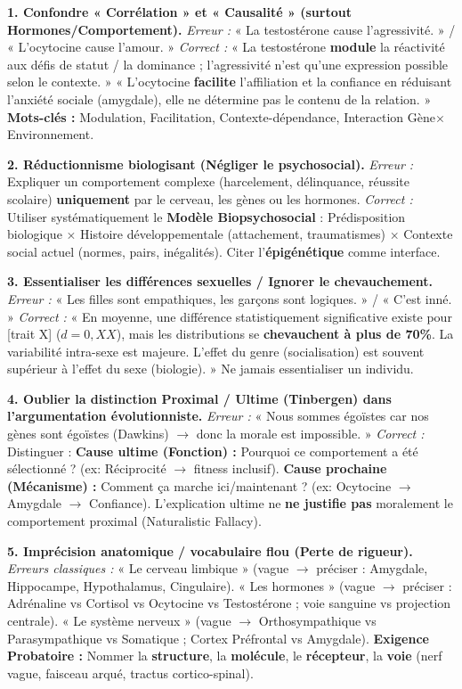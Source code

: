 \documentclass[11pt]{article}
\begin{document}
\begin{attention}
    \textbf{1. Confondre « Corrélation » et « Causalité » (surtout Hormones/Comportement).}
    \textit{Erreur :} « La testostérone cause l'agressivité. » / « L'ocytocine cause l'amour. »
    \textit{Correct :} « La testostérone \textbf{module} la réactivité aux défis de statut / la dominance ; l'agressivité n'est qu'une expression possible selon le contexte. » « L'ocytocine \textbf{facilite} l'affiliation et la confiance en réduisant l'anxiété sociale (amygdale), elle ne détermine pas le contenu de la relation. » \textbf{Mots-clés :} Modulation, Facilitation, Contexte-dépendance, Interaction Gène$\times$Environnement.

    \textbf{2. Réductionnisme biologisant (Négliger le psychosocial).}
    \textit{Erreur :} Expliquer un comportement complexe (harcelement, délinquance, réussite scolaire) \textbf{uniquement} par le cerveau, les gènes ou les hormones.
    \textit{Correct :} Utiliser systématiquement le \textbf{Modèle Biopsychosocial} : Prédisposition biologique $\times$ Histoire développementale (attachement, traumatismes) $\times$ Contexte social actuel (normes, pairs, inégalités). Citer l'\textbf{épigénétique} comme interface.

    \textbf{3. Essentialiser les différences sexuelles / Ignorer le chevauchement.}
    \textit{Erreur :} « Les filles sont empathiques, les garçons sont logiques. » / « C'est inné. »
    \textit{Correct :} « En moyenne, une différence statistiquement significative existe pour [trait X] ($d = 0,XX$), mais les distributions se \textbf{chevauchent à plus de 70\%}. La variabilité intra-sexe est majeure. L'effet du genre (socialisation) est souvent supérieur à l'effet du sexe (biologie). » Ne jamais essentialiser un individu.

    \textbf{4. Oublier la distinction Proximal / Ultime (Tinbergen) dans l'argumentation évolutionniste.}
    \textit{Erreur :} « Nous sommes égoïstes car nos gènes sont égoïstes (Dawkins) $\to$ donc la morale est impossible. »
    \textit{Correct :} Distinguer : \textbf{Cause ultime (Fonction) :} Pourquoi ce comportement a été sélectionné ? (ex: Réciprocité $\to$ fitness inclusif). \textbf{Cause prochaine (Mécanisme) :} Comment ça marche ici/maintenant ? (ex: Ocytocine $\to$ Amygdale $\to$ Confiance). L'explication ultime ne \textbf{ne justifie pas} moralement le comportement proximal (Naturalistic Fallacy).

    \textbf{5. Imprécision anatomique / vocabulaire flou (Perte de rigueur).}
    \textit{Erreurs classiques :} « Le cerveau limbique » (vague $\to$ préciser : Amygdale, Hippocampe, Hypothalamus, Cingulaire). « Les hormones » (vague $\to$ préciser : Adrénaline vs Cortisol vs Ocytocine vs Testostérone ; voie sanguine vs projection centrale). « Le système nerveux » (vague $\to$ Orthosympathique vs Parasympathique vs Somatique ; Cortex Préfrontal vs Amygdale). \textbf{Exigence Probatoire :} Nommer la \textbf{structure}, la \textbf{molécule}, le \textbf{récepteur}, la \textbf{voie} (nerf vague, faisceau arqué, tractus cortico-spinal).
\end{attention}
\end{document}
